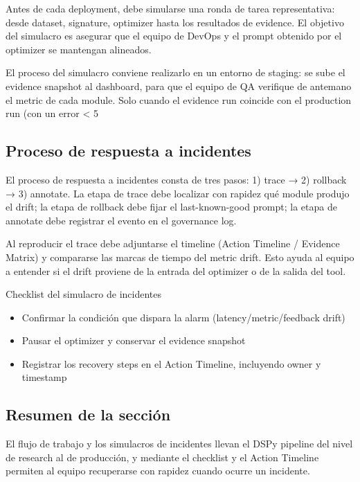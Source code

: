 \documentclass[a4paper]{article}
\begin{document}
Antes de cada deployment, debe simularse una ronda de tarea representativa: desde dataset, signature, optimizer hasta los resultados de evidence. El objetivo del simulacro es asegurar que el equipo de DevOps y el prompt obtenido por el optimizer se mantengan alineados.

El proceso del simulacro conviene realizarlo en un entorno de staging: se sube el evidence snapshot al dashboard, para que el equipo de QA verifique de antemano el metric de cada module. Solo cuando el evidence run coincide con el production run (con un error < 5 %

\subsection{Proceso de respuesta a incidentes}

El proceso de respuesta a incidentes consta de tres pasos: 1) trace → 2) rollback → 3) annotate. La etapa de trace debe localizar con rapidez qué module produjo el drift; la etapa de rollback debe fijar el last-known-good prompt; la etapa de annotate debe registrar el evento en el governance log.

Al reproducir el trace debe adjuntarse el timeline (Action Timeline / Evidence Matrix) y compararse las marcas de tiempo del metric drift. Esto ayuda al equipo a entender si el drift proviene de la entrada del optimizer o de la salida del tool.

\begin{importantbox}{Checklist del simulacro de incidentes}
\begin{itemize}
    \item Confirmar la condición que dispara la alarm (latency/metric/feedback drift)
    \item Pausar el optimizer y conservar el evidence snapshot
    \item Registrar los recovery steps en el Action Timeline, incluyendo owner y timestamp
\end{itemize}
\end{importantbox}

\subsection{Resumen de la sección}

El flujo de trabajo y los simulacros de incidentes llevan el DSPy pipeline del nivel de research al de producción, y mediante el checklist y el Action Timeline permiten al equipo recuperarse con rapidez cuando ocurre un incidente.
\end{document}

